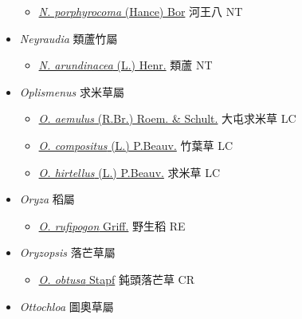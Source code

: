\begin{itemize}
  \begin{itemize}
        \item[] \href{http://www.theplantlist.org/tpl1.1/search?q=Narenga+porphyrocoma}{\textit{N. porphyrocoma} (Hance) Bor}   河王八 NT
  \end{itemize}
 \item[] \textit{Neyraudia} 類蘆竹屬
                    
  \begin{itemize}
        \item[] \href{http://www.theplantlist.org/tpl1.1/search?q=Neyraudia+arundinacea}{\textit{N. arundinacea} (L.) Henr.}   類蘆 NT
  \end{itemize}
 \item[] \textit{Oplismenus} 求米草屬
                    
  \begin{itemize}
        \item[] \href{http://www.theplantlist.org/tpl1.1/search?q=Oplismenus+aemulus}{\textit{O. aemulus} (R.Br.) Roem. \& Schult.}   大屯求米草 LC
        \item[] \href{http://www.theplantlist.org/tpl1.1/search?q=Oplismenus+compositus}{\textit{O. compositus} (L.) P.Beauv.}   竹葉草 LC
        \item[] \href{http://www.theplantlist.org/tpl1.1/search?q=Oplismenus+hirtellus}{\textit{O. hirtellus} (L.) P.Beauv.}   求米草 LC
  \end{itemize}
 \item[] \textit{Oryza} 稻屬
                    
  \begin{itemize}
        \item[] \href{http://www.theplantlist.org/tpl1.1/search?q=Oryza+rufipogon}{\textit{O. rufipogon} Griff.}   野生稻 RE
  \end{itemize}
 \item[] \textit{Oryzopsis} 落芒草屬
                    
  \begin{itemize}
        \item[] \href{http://www.theplantlist.org/tpl1.1/search?q=Oryzopsis+obtusa}{\textit{O. obtusa} Stapf}   鈍頭落芒草 CR
  \end{itemize}
 \item[] \textit{Ottochloa} 圖奧草屬
                    

\end{itemize}

